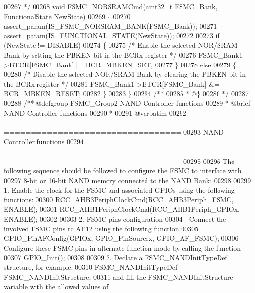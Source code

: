 \begin{DoxyCode}
00267 \textcolor{comment}{  */}
00268 \textcolor{keywordtype}{void} FSMC_NORSRAMCmd(uint32\_t FSMC\_Bank, FunctionalState NewState)
00269 \{
00270   assert_param(IS\_FSMC\_NORSRAM\_BANK(FSMC\_Bank));
00271   assert_param(IS\_FUNCTIONAL\_STATE(NewState));
00272 
00273   \textcolor{keywordflow}{if} (NewState != DISABLE)
00274   \{
00275     \textcolor{comment}{/* Enable the selected NOR/SRAM Bank by setting the PBKEN bit in the BCRx register */}
00276     FSMC_Bank1->BTCR[FSMC\_Bank] |= BCR_MBKEN_SET;
00277   \}
00278   \textcolor{keywordflow}{else}
00279   \{
00280     \textcolor{comment}{/* Disable the selected NOR/SRAM Bank by clearing the PBKEN bit in the BCRx register */}
00281     FSMC_Bank1->BTCR[FSMC\_Bank] &= BCR_MBKEN_RESET;
00282   \}
00283 \}
00284 \textcolor{comment}{/**}
00285 \textcolor{comment}{  * @\}}
00286 \textcolor{comment}{  */}
00287 
00288 \textcolor{comment}{/** @defgroup FSMC\_Group2 NAND Controller functions}
00289 \textcolor{comment}{ *  @brief   NAND Controller functions }
00290 \textcolor{comment}{ *}
00291 \textcolor{comment}{@verbatim   }
00292 \textcolor{comment}{ ===============================================================================}
00293 \textcolor{comment}{                    NAND Controller functions}
00294 \textcolor{comment}{ ===============================================================================  }
00295 \textcolor{comment}{}
00296 \textcolor{comment}{ The following sequence should be followed to configure the FSMC to interface with}
00297 \textcolor{comment}{ 8-bit or 16-bit NAND memory connected to the NAND Bank:}
00298 \textcolor{comment}{ }
00299 \textcolor{comment}{   1. Enable the clock for the FSMC and associated GPIOs using the following functions:}
00300 \textcolor{comment}{          RCC\_AHB3PeriphClockCmd(RCC\_AHB3Periph\_FSMC, ENABLE);}
00301 \textcolor{comment}{          RCC\_AHB1PeriphClockCmd(RCC\_AHB1Periph\_GPIOx, ENABLE);}
00302 \textcolor{comment}{}
00303 \textcolor{comment}{   2. FSMC pins configuration }
00304 \textcolor{comment}{       - Connect the involved FSMC pins to AF12 using the following function }
00305 \textcolor{comment}{          GPIO\_PinAFConfig(GPIOx, GPIO\_PinSourcex, GPIO\_AF\_FSMC); }
00306 \textcolor{comment}{       - Configure these FSMC pins in alternate function mode by calling the function}
00307 \textcolor{comment}{          GPIO\_Init();    }
00308 \textcolor{comment}{       }
00309 \textcolor{comment}{   3. Declare a FSMC\_NANDInitTypeDef structure, for example:}
00310 \textcolor{comment}{          FSMC\_NANDInitTypeDef  FSMC\_NANDInitStructure;}
00311 \textcolor{comment}{      and fill the FSMC\_NANDInitStructure variable with the allowed values of}

\end{DoxyCode}
